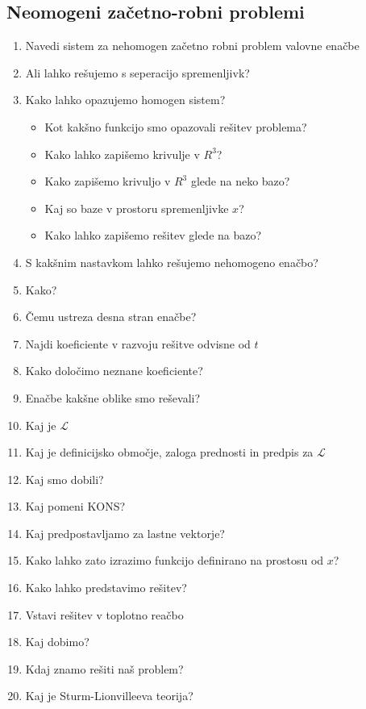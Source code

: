 \documentclass{article}
\begin{document}
    \subsection{Neomogeni začetno-robni problemi}
    \begin{enumerate}
        \item Navedi sistem za nehomogen začetno robni problem valovne enačbe
        \item Ali lahko rešujemo s seperacijo spremenljivk?
        \item Kako lahko opazujemo homogen sistem?
        \begin{itemize}
            \item Kot kakšno funkcijo smo opazovali rešitev problema?
            \item Kako lahko zapišemo krivulje v $R^3$?
            \item Kako zapišemo krivuljo v $R^3$ glede na neko bazo?
            \item Kaj so baze v prostoru spremenljivke $x$?
            \item Kako lahko zapišemo rešitev glede na bazo?
        \end{itemize}
        \item S kakšnim nastavkom lahko rešujemo nehomogeno enačbo?
        \item Kako?
        \item Čemu ustreza desna stran enačbe?
        \item Najdi koeficiente v razvoju rešitve odvisne od $t$
        \item Kako določimo neznane koeficiente?
        \item Enačbe kakšne oblike smo reševali?
        \item Kaj je $\mathcal{L}$
        \item Kaj je definicijsko območje, zaloga prednosti in predpis za $\mathcal{L}$
        \item Kaj smo dobili?
        \item Kaj pomeni KONS?
        \item Kaj predpostavljamo za lastne vektorje?
        \item Kako lahko zato izrazimo funkcijo definirano na prostosu od $x$?
        \item Kako lahko predstavimo rešitev?
        \item Vstavi rešitev v toplotno reačbo
        \item Kaj dobimo?
        \item Kdaj znamo rešiti naš problem?
        \item Kaj je Sturm-Lionvilleeva teorija?
    \end{enumerate}
\end{document}
